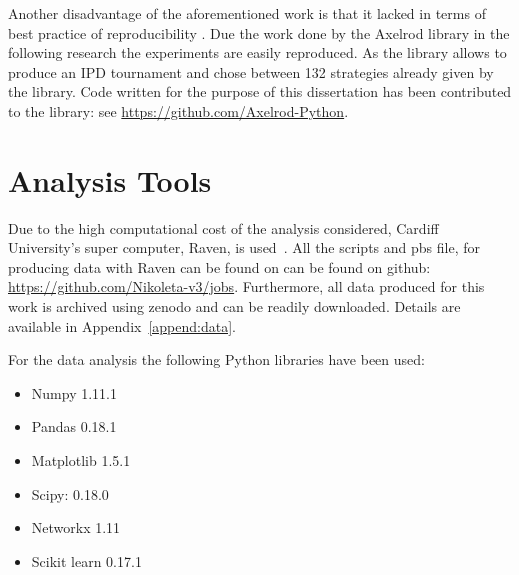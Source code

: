 Another disadvantage of the aforementioned work is that it lacked in terms of
best practice of reproducibility \cite{Axelrod1980a,Axelrod1980b,Stephens2002,Chong2004,Stewart2013}.
Due the work done by the Axelrod library \cite{axelrodproject} in the following research
the experiments are easily reproduced. As the library allows to produce an IPD
tournament and chose between 132 strategies already given by the library.
Code written for the purpose of this dissertation has been contributed to the
library: see \url{https://github.com/Axelrod-Python}.

\section{Analysis Tools}
Due to the high computational cost of the analysis considered, Cardiff
University's super computer, Raven, is used~\cite{raven}. All the scripts and pbs
file, for producing data with Raven can be found on can be found on github:
\url{https://github.com/Nikoleta-v3/jobs}. Furthermore, all data produced for
this work is archived using zenodo and can be readily downloaded. Details are
available in Appendix~\ref{append:data}.

For the data analysis the following Python libraries have been used:

\begin{multicols}{2}
	\begin{itemize}
		\item Numpy 1.11.1~\cite{numpy}
		\item Pandas 0.18.1~\cite{pandas}
		\item Matplotlib 1.5.1~\cite{matplot}
		\item Scipy: 0.18.0~\cite{scipy}
		\item Networkx 1.11~\cite{networkx}
    \item Scikit learn 0.17.1~\cite{scikit}
	\end{itemize}
\end{multicols}

